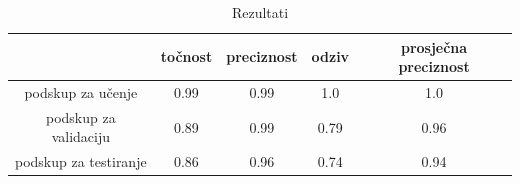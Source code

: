 \documentclass[times, utf8, diplomski, numeric]{fer}
\begin{document}
\begin{table}[H]
\centering
\caption{Rezultati}
\label{score:temporal}
\begin{tabular}{c|c|c|c|c|}
\cline{2-5}
                                            & točnost & preciznost & odziv & prosječna preciznost \\ \hline
\multicolumn{1}{|c|}{podskup za učenje}     & 0.99       & 0.99        & 1.0     &           1.0           \\ \hline
\multicolumn{1}{|c|}{podskup za validaciju} & 0.89       & 0.99        & 0.79     &            0.96          \\ \hline
\multicolumn{1}{|c|}{podskup za testiranje} & 0.86       & 0.96        & 0.74     &            0.94          \\ \hline
\end{tabular}
\end{table}
\end{document}
